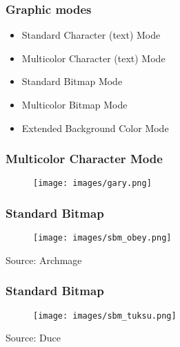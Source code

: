\documentclass[aspectratio=43]{uva-inf-presentation}
\begin{document}
%
%
%


\begin{frame}
\frametitle{Graphic modes}

\begin{itemize}
\item Standard Character (text) Mode
\item Multicolor Character (text) Mode
\item Standard Bitmap Mode
\item Multicolor Bitmap Mode
\item Extended Background Color Mode
\end{itemize}

\end{frame}


\begin{frame}
\frametitle{Multicolor Character Mode}

\begin{figure}
\texttt{[image: images/gary.png]}
\end{figure}

\end{frame}


\begin{frame}
\frametitle{Standard Bitmap}

\begin{figure}
\texttt{[image: images/sbm\_obey.png]}
\end{figure}

\begin{center}
Source: Archmage
\end{center}

\end{frame}


\begin{frame}
\frametitle{Standard Bitmap}

\begin{figure}
\texttt{[image: images/sbm\_tuksu.png]}
\end{figure}

\begin{center}
Source: Duce
\end{center}

\end{frame}
\end{document}
